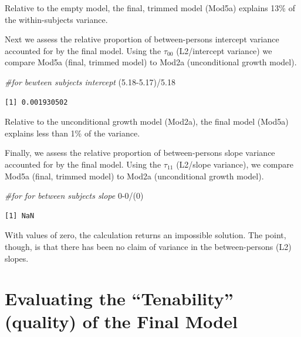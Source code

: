 \documentclass[
  11pt,
]{book}
\newenvironment{Shaded}{\begin{snugshade}}{\end{snugshade}}
\newcommand{\CommentTok}[1]{\textcolor[rgb]{0.56,0.35,0.01}{\textit{#1}}}
\newcommand{\DecValTok}[1]{\textcolor[rgb]{0.00,0.00,0.81}{#1}}
\newcommand{\FloatTok}[1]{\textcolor[rgb]{0.00,0.00,0.81}{#1}}
\newcommand{\NormalTok}[1]{#1}
\newcommand{\SpecialCharTok}[1]{\textcolor[rgb]{0.00,0.00,0.00}{#1}}
\begin{document}
Relative to the empty model, the final, trimmed model (Mod5a) explains 13\% of the within-subjects variance.

Next we assess the relative proportion of between-persons intercept variance accounted for by the final model. Using the \(\tau _{00}\) (L2/intercept variance) we compare Mod5a (final, trimmed model) to Mod2a (unconditional growth model).

\begin{Shaded}
\begin{Highlighting}[]
\CommentTok{\#for bewteen subjects intercept}
\NormalTok{(}\FloatTok{5.18{-}5.17}\NormalTok{)}\SpecialCharTok{/}\FloatTok{5.18}
\end{Highlighting}
\end{Shaded}

\begin{verbatim}
[1] 0.001930502
\end{verbatim}

Relative to the unconditional growth model (Mod2a), the final model (Mod5a) explains less than 1\% of the variance.

Finally, we assess the relative proportion of between-persons slope variance accounted for by the final model. Using the \(\tau _{11}\) (L2/slope variance), we compare Mod5a (final, trimmed model) to Mod2a (unconditional growth model).

\begin{Shaded}
\begin{Highlighting}[]
\CommentTok{\#for for between subjects slope}
\DecValTok{0{-}0}\SpecialCharTok{/}\NormalTok{(}\DecValTok{0}\NormalTok{)}
\end{Highlighting}
\end{Shaded}

\begin{verbatim}
[1] NaN
\end{verbatim}

With values of zero, the calculation returns an impossible solution. The point, though, is that there has been no claim of variance in the between-persons (L2) slopes.

\hypertarget{evaluating-the-tenability-quality-of-the-final-model}{%
\section{Evaluating the ``Tenability'' (quality) of the Final Model}\label{evaluating-the-tenability-quality-of-the-final-model}}
\end{document}
